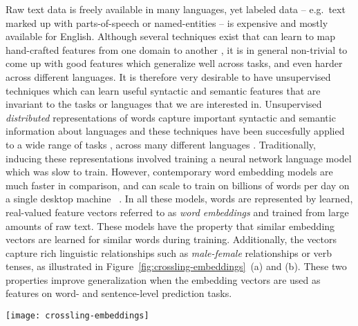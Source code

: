 \documentclass[10pt]{article}
\begin{document}
Raw text data is freely available in many languages, yet labeled data --
e.g.\ text marked up with parts-of-speech or named-entities -- is
expensive and mostly available for English. Although several techniques exist
that can learn to map hand-crafted features from one domain to another
\cite{blitzer2006domain,daume2009frustratingly,pan2010survey}, it is in general
non-trivial to come up with good features which generalize well across tasks,
and even harder across different languages. It is therefore very desirable to
have unsupervised techniques which can learn useful syntactic and semantic
features that are invariant to the tasks or languages that we are interested
in.  Unsupervised \emph{distributed} representations of words capture important
syntactic and semantic information about languages and these techniques have
been succesfully applied to a wide range of tasks
\cite{collobert2011natural,turian2010word}, across many different languages
\cite{polyglot2013}. Traditionally, inducing these representations involved
training a neural network language model \cite{bengio2003neural} which was slow
to train. However, contemporary word embedding models are much faster in comparison,
and can scale to train on billions of words per day on a single desktop machine
~\cite{mnih2012fast,mikolov2013distributed,pennington2014glove}. In
all these models, words are represented by learned, real-valued feature vectors
referred to as \emph{word embeddings} and trained from large amounts of raw text.
These models have the property that similar embedding vectors are learned for
similar words during training. Additionally, the vectors capture rich linguistic relationships
such as \emph{male-female} relationships or verb tenses, as illustrated in 
Figure~\ref{fig:crossling-embeddings}~(a) and (b).  These two properties improve 
generalization when the embedding
vectors are used as features on word- and sentence-level prediction tasks.

\begin{figure*}
  \begin{center}
    \texttt{[image: crossling-embeddings]}
  \end{center}
  \caption{(a \& b) Monolingual embeddings have been shown to capture syntactic
  and semantic features such as noun gender (blue) and verb tense
  (red).  (c) The (idealized) goal of crosslingual embeddings is to capture these
  relationships across two or more languages.}
  \label{fig:crossling-embeddings}
\end{figure*}
\end{document}
